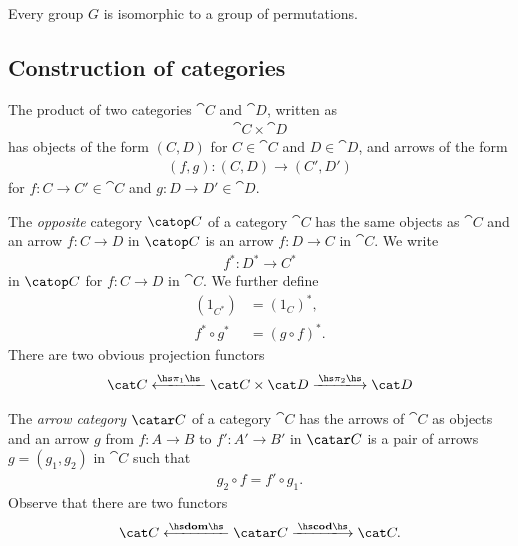 \documentclass{article}
\begin{document}
\begin{theorem}[Cayley]
    Every group $G$ is isomorphic to a group of permutations.
\end{theorem}



\subsection{Construction of categories}

\begin{definition}
    The product of two categories $\cat{C}$ and $\cat{D}$, written
    as
    \begin{align*}
        \cat{C}\times\cat{D}
    \end{align*} 
    has objects of the form $(C,D)$ for $C\in\cat{C}$ and $D\in\cat{D}$,
    and arrows of the form
    \begin{align*}
        (f,g):(C,D)\to (C',D')
    \end{align*}
    for $f:C\to C'\in\cat{C}$ and $g:D\to D'\in\cat{D}$.
\end{definition}

\begin{definition}
    The \emph{opposite} category $\catop C$ of a category $\cat C$ has
    the same objects as $\cat C$ and an arrow $f:C\to D$ in $\catop C$
    is an arrow $f:D\to C$ in $\cat C$. We write
    \begin{align*}
        f^* : D^* \to C^*
    \end{align*} 
    in $\catop C$ for $f:C\to D$ in $\cat C$. We further define
    \begin{align*}
         (1_{C^*}) &= (1_C)^*,\\ 
         f^*\circ g^*&= (g\circ f)^*.
    \end{align*}
    There are two obvious projection functors
    \begin{align*}
        \cat C \xlongleftarrow{\hs\pi_1\hs} \cat C\times \cat D \xlongrightarrow{\hs\pi_2\hs} \cat D
    \end{align*}
\end{definition}

\begin{definition}
    The \emph{arrow category} $\catar C$ of a category $\cat C$
    has the arrows of $\cat C$ as objects and an arrow $g$ from
    $f:A\to B$ to $f':A'\to B'$ in $\catar C$ is a pair of arrows
    $g=(g_1, g_2)$ in $\cat C$ such that 
    \begin{align*}
        g_2\circ f = f'\circ g_1.
    \end{align*}
    Observe that there are two functors
    \begin{align*}
        \cat C \xlongleftarrow{\hs\textbf{dom}\hs} \catar C \xlongrightarrow{\hs\textbf{cod}\hs} \cat C.
    \end{align*}
\end{definition}
\end{document}
